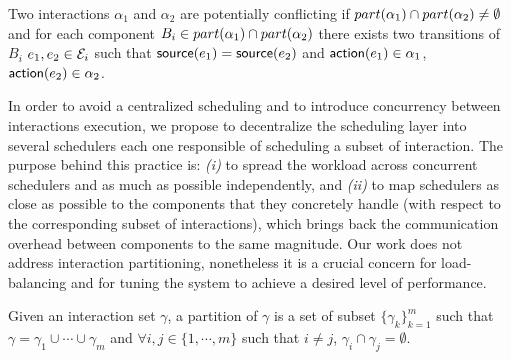 \begin{definition}\label{def:pconf}
  Two interactions $\alpha_1$ and $\alpha_2$ are potentially conflicting if 
  $part(\alpha_1)\cap part(\alpha_2)\neq\emptyset$ and for each component $B_i\in part(\alpha_1)\cap
  part(\alpha_2)$ there exists two transitions of $B_i$ 
  $e_1,e_2\in\mathcal{E}_i$ such that $\textsf{source}(e_1)=\textsf{source}(e_2)$ and $\textsf{action}(e_1)\in\alpha_1$,
  $\textsf{action}(e_2)\in\alpha_2$.
\end{definition}


In order to avoid a centralized scheduling and to introduce concurrency between interactions
execution, we propose to decentralize the scheduling layer into several schedulers each one
responsible of scheduling a subset of interaction. The purpose behind this practice is: 
\emph{(i)} to spread the workload across concurrent schedulers and
as much as possible independently, and \emph{(ii)} to map schedulers as close as possible to 
the components that they concretely handle (with respect to the corresponding subset of 
interactions), which brings back the communication overhead between components to the same 
magnitude. Our work does not address interaction partitioning, nonetheless it is a crucial 
concern for load-balancing and for tuning the system to achieve a desired level of performance. 

\begin{definition}\label{def:inter_part}
  Given an interaction set $\gamma$, a partition of $\gamma$ is a set of subset 
  $\{\gamma_k\}_{k=1}^m$ such that $\gamma=\gamma_1\cup\cdots\cup\gamma_m$ and 
  $\forall i,j\in\{1,\cdots,m\}$ such that $i\neq j$, $\gamma_i\cap\gamma_j=\emptyset$.
\end{definition}

